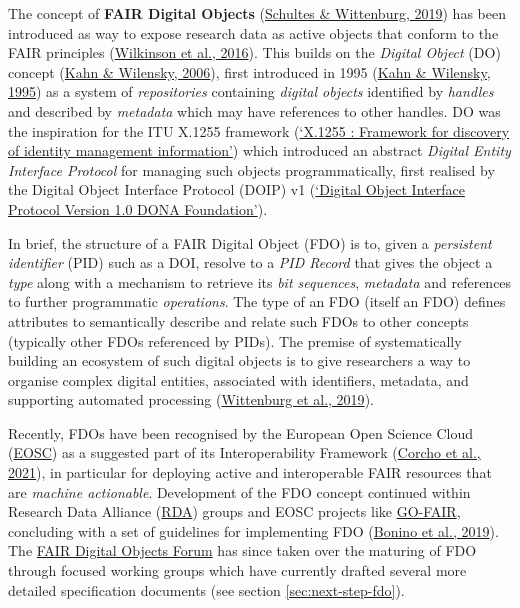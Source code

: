 The concept of \textbf{FAIR Digital Objects} (\protect\hyperlink{ref-IHLT6hye}{Schultes \& Wittenburg, 2019}) has been introduced as way to expose research data as active objects that conform to the FAIR principles (\protect\hyperlink{ref-6DjakjNS}{Wilkinson et al., 2016}). This builds on the \emph{Digital Object} (DO) concept (\protect\hyperlink{ref-11MnuwJ4l}{Kahn \& Wilensky, 2006}), first introduced in 1995 (\protect\hyperlink{ref-3Uqe3fuK}{Kahn \& Wilensky, 1995}) as a system of \emph{repositories} containing \emph{digital objects} identified by \emph{handles} and described by \emph{metadata} which may have references to other handles. DO was the inspiration for the ITU X.1255 framework (\protect\hyperlink{ref-103Hw8H43}{{`X.1255 : Framework for discovery of identity management information'}}) which introduced an abstract \emph{Digital Entity Interface Protocol} for managing such objects programmatically, first realised by the Digital Object Interface Protocol (DOIP) v1 (\protect\hyperlink{ref-16uB3jxpa}{{`Digital Object Interface Protocol Version 1.0 \textbar{} DONA Foundation'}}).

In brief, the structure of a FAIR Digital Object (FDO) is to, given a \emph{persistent identifier} (PID) such as a DOI, resolve to a \emph{PID Record} that gives the object a \emph{type} along with a mechanism to retrieve its \emph{bit sequences}, \emph{metadata} and references to further programmatic \emph{operations}. The type of an FDO (itself an FDO) defines attributes to semantically describe and relate such FDOs to other concepts (typically other FDOs referenced by PIDs). The premise of systematically building an ecosystem of such digital objects is to give researchers a way to organise complex digital entities, associated with identifiers, metadata, and supporting automated processing (\protect\hyperlink{ref-tz0P3DTC}{Wittenburg et al., 2019}).

Recently, FDOs have been recognised by the European Open Science Cloud (\href{https://eosc.eu/}{EOSC}) as a suggested part of its Interoperability Framework (\protect\hyperlink{ref-aCye3KpE}{Corcho et al., 2021}), in particular for deploying active and interoperable FAIR resources that are \emph{machine actionable}. Development of the FDO concept continued within Research Data Alliance (\href{https://www.rd-alliance.org/}{RDA}) groups and EOSC projects like \href{https://www.go-fair.org/}{GO-FAIR}, concluding with a set of guidelines for implementing FDO (\protect\hyperlink{ref-RwvirqWg}{Bonino et al., 2019}). The \href{https://fairdo.org/}{FAIR Digital Objects Forum} has since taken over the maturing of FDO through focused working groups which have currently drafted several more detailed specification documents (see section \ref{sec:next-step-fdo}).

